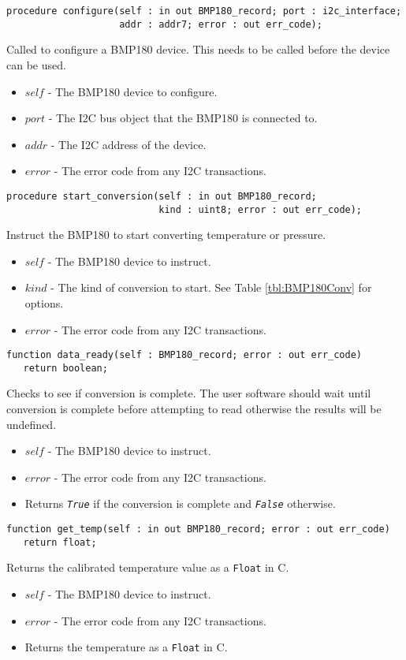 \documentclass[10pt, openany]{book}
\newcommand{\constant}[1]{\emph{\texttt{#1}}}
\newcommand{\datatype}[1]{\texttt{#1}}
\begin{document}
\begin{lstlisting}
procedure configure(self : in out BMP180_record; port : i2c_interface;
                    addr : addr7; error : out err_code);
\end{lstlisting}
Called to configure a BMP180 device.  This needs to be called before the device can be used.
\begin{itemize}
  \item $self$ - The BMP180 device to configure.
  \item $port$ - The I2C bus object that the BMP180 is connected to.
  \item $addr$ - The I2C address of the device.
  \item $error$ - The error code from any I2C transactions.
\end{itemize}

\begin{lstlisting}
procedure start_conversion(self : in out BMP180_record;
                           kind : uint8; error : out err_code);
\end{lstlisting}
Instruct the BMP180 to start converting temperature or pressure.
\begin{itemize}
  \item $self$ - The BMP180 device to instruct.
  \item $kind$ - The kind of conversion to start.  See Table \ref{tbl:BMP180Conv} for options.
  \item $error$ - The error code from any I2C transactions.
\end{itemize}

\begin{lstlisting}
function data_ready(self : BMP180_record; error : out err_code)
   return boolean;
\end{lstlisting}
Checks to see if conversion is complete.  The user software should wait until conversion is complete before attempting to read otherwise the results will be undefined.
\begin{itemize}
  \item $self$ - The BMP180 device to instruct.
  \item $error$ - The error code from any I2C transactions.
  \item Returns \constant{True} if the conversion is complete and \constant{False} otherwise.
\end{itemize}

\begin{lstlisting}
function get_temp(self : in out BMP180_record; error : out err_code)
   return float;
\end{lstlisting}
Returns the calibrated temperature value as a \datatype{Float} in \degree{}C.
\begin{itemize}
  \item $self$ - The BMP180 device to instruct.
  \item $error$ - The error code from any I2C transactions.
  \item Returns the temperature as a \datatype{Float} in \degree{}C.
\end{itemize}
\end{document}
